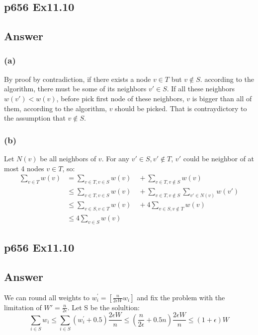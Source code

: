 \documentclass[a4paper]{article}
\begin{document}
\subsection*{p656 Ex11.10}
\subsection*{ Answer}
\subsubsection*{(a)}
By proof by contradiction, if there exists a node $v \in T$ but $v \notin S$. according to the algorithm, there must be some of its neighbors $v' \in S$. If all these neighbors $w(v')<w(v)$, before  pick first node of these neighbors, $v$ is bigger than all of them, according to the algorithm, $v$ should be picked. That is contraydictory to the assumption that $v \notin S$.
\subsubsection*{(b)}
Let $N(v)$ be all neighbors of $v$. For any $v'\in S, v'\notin T$, $v'$ could be neighbor of at most 4 nodes $v \in T$, so:
$$
	\begin{aligned}
		\sum_{v\in T} w(v) & =  \sum_{v\in T, v\in S}w(v) \quad + \sum_{v\in T, v\notin S}w(v)                     \\
		                   & \leq \sum_{v\in T, v\in S}w(v) \quad + \sum_{v\in T, v\notin S}\sum_{v'\in N(v)}w(v') \\
		                   & \leq \sum_{v\in S, v\in T}w(v) \quad + 4\sum_{v\in S, v\notin T}w(v)                  \\
		                   & \leq 4\sum_{v\in S} w(v)
	\end{aligned}
$$
\vspace*{2cm}

\subsection*{p656 Ex11.10}
\subsection*{ Answer}
We can round all weights to $w_{i}^{'}=[\frac{n}{2\epsilon W}w_i]$ and fix the problem with the limitation of $W'=\frac{n}{2\epsilon}$. Let S be the solultion:
$$
	\sum_{i\in S}w_i \leq \sum_{i\in S}{(w_{i}^{'}+0.5)\frac{2\epsilon W}{n}}
	\leq (\frac{n}{2\epsilon}+0.5n)\frac{2\epsilon W}{n} \leq (1+\epsilon)W
$$
\vspace*{2cm}
\end{document}
